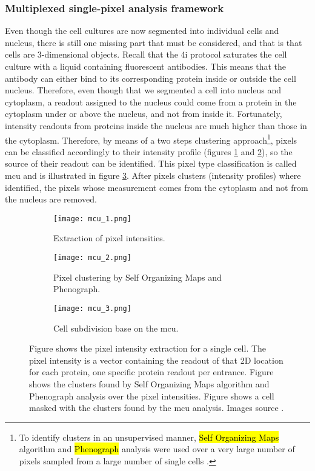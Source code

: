 \subsubsection{Multiplexed single-pixel analysis framework}
Even though the cell cultures are now segmented into individual cells and nucleus, there is still one missing part that must be considered, and that is that cells are 3-dimensional objects. Recall that the \gls{4i} protocol saturates the cell culture with a liquid containing fluorescent antibodies. This means that the antibody can either bind to its corresponding protein inside or outside the cell nucleus. Therefore, even though that we segmented a cell into nucleus and cytoplasm, a readout assigned to the nucleus could come from a protein in the cytoplasm under or above the nucleus, and not from inside it. Fortunately, intensity readouts from proteins inside the nucleus are much higher than those in the cytoplasm. Therefore, by means of a two steps clustering approach\footnote{To identify clusters in an unsupervised manner, \hl{Self Organizing Maps} algorithm and \hl{Phenograph} analysis were used over a very large number of pixels sampled from a large number of single cells \cite{Guteaar7042}.}, pixels can be classified accordingly to their intensity profile (figures \ref{fig:mcu:1} and \ref{fig:mcu:2}), so the source of their readout can be identified. This pixel type classification is called \Acrfull{mcu} and is illustrated in figure \ref{fig:mcu:3}. After pixels clusters (intensity profiles) where identified, the pixels whose measurement comes from the cytoplasm and not from the nucleus are removed.

\begin{figure}[htb]
  \centering
  \begin{subfigure}[t]{.3\linewidth}
    \texttt{[image: mcu\_1.png]}
    \caption{Extraction of pixel intensities.}
    \label{fig:mcu:1}
  \end{subfigure}
  \hspace{4mm}
  \begin{subfigure}[t]{.3\linewidth}
    \texttt{[image: mcu\_2.png]}
    \caption{Pixel clustering by Self Organizing Maps and Phenograph.}
    \label{fig:mcu:2}
  \end{subfigure}
  \hspace{4mm}
  \begin{subfigure}[t]{.3\linewidth}
    \texttt{[image: mcu\_3.png]}
    \caption{Cell subdivision base on the \gls{mcu}.}
    \label{fig:mcu:3}
  \end{subfigure}
  \caption{Figure  shows the pixel intensity extraction for a single cell. The pixel intensity is a vector containing the readout of that 2D location for each protein, one specific protein readout per entrance. Figure  shows the clusters found by Self Organizing Maps algorithm and Phenograph analysis over the pixel intensities. Figure  shows a cell masked with the clusters found by the \gls{mcu} analysis. Images source \cite{Guteaar7042}.}
  \label{fig:mcu}
\end{figure}

